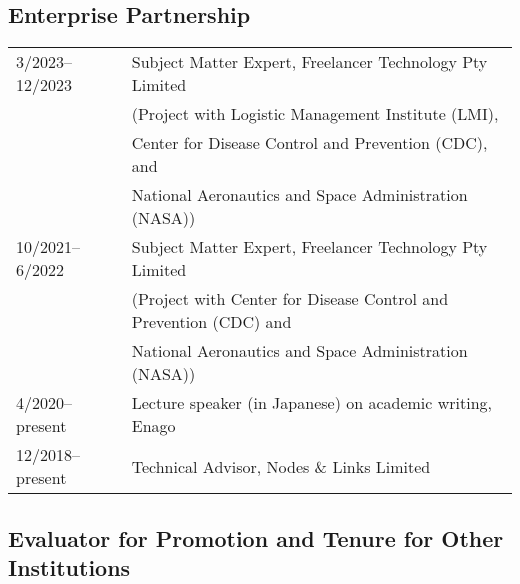 \documentclass[11pt,letter]{article}
\begin{document}
\subsection*{\bf \normalsize Enterprise Partnership}

\begin{tabular}{ll}
%
3/2023--12/2023 & Subject Matter Expert, Freelancer Technology Pty Limited\\
& (Project with Logistic Management Institute (LMI),\\
& Center for Disease Control and Prevention (CDC), and\\
& National Aeronautics and Space Administration (NASA))\\[2.5mm]
%
10/2021--6/2022 & Subject Matter Expert, Freelancer Technology Pty Limited\\
& (Project with Center for Disease Control and Prevention (CDC) and\\
& National Aeronautics and Space Administration (NASA))\\[2.5mm]
%
4/2020--present & Lecture speaker (in Japanese) on academic writing, Enago\\[2.5mm]
%
12/2018--present & Technical Advisor, Nodes \& Links Limited
%

\end{tabular}

\subsection*{\bf \normalsize Evaluator for Promotion and Tenure for Other Institutions}
\end{document}
